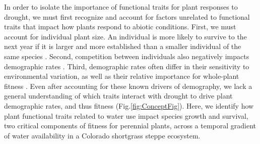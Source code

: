 \documentclass[12pt, letterpaper]{article}
\begin{document}
In order to isolate the importance of functional traits for plant responses to drought, we must first recognize and account for factors unrelated to functional traits that impact how plants respond to abiotic conditions. First, we must account for individual plant size. An individual is more likely to survive to the next year if it is larger and more established than a smaller individual of the same species \citep{Tredennick2017}. Second, competition between individuals also negatively impacts demographic rates \citep{Adler2012}. Third, demographic rates often differ in their sensitivity to environmental variation, as well as their relative importance for whole-plant fitness \citep{Laughlin2020TheFitness,Dibner2019}. Even after accounting for these known drivers of demography, we lack a general understanding of which traits interact with drought to drive plant demographic rates, and thus fitness \citep{Laughlin2018,Laughlin2020TheFitness}(Fig.\ref{fig:ConceptFig}). Here, we identify how plant functional traits related to water use impact species growth and survival, two critical components of fitness for perennial plants, across a temporal gradient of water availability in a Colorado shortgrass steppe ecosystem. 

\end{document}
